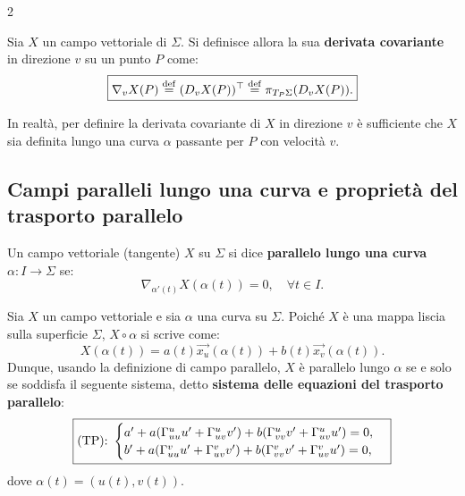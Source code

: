 \begin{multicols*}{2}
    \begin{definition}
        Sia $X$ un campo vettoriale di $\Sigma$. Si definisce allora
        la sua \textbf{derivata covariante} in direzione $v$ su un punto $P$ come:
        \[
            \boxed{\nabla_v X(P) \overset{\mathrm{def}}{=} (D_v X(P))^\top \overset{\mathrm{def}}{=} \pi_{T_P \Sigma}(D_v X(P)).}
        \]
    \end{definition}

    \begin{remark}
        In realtà, per definire la derivata covariante di $X$ in direzione $v$ è sufficiente
        che $X$ sia definita lungo una curva $\alpha$ passante per $P$ con velocità
        $v$.
    \end{remark}

    \subsection{Campi paralleli lungo una curva e proprietà del trasporto parallelo}

    \begin{definition}
        Un campo vettoriale (tangente) $X$ su $\Sigma$ si dice \textbf{parallelo lungo
            una curva $\alpha : I \to \Sigma$} se:
        \[
            \boxed{\nabla_{\alpha'(t)} X(\alpha(t)) = 0, \quad \forall t \in I.}
        \]
    \end{definition}

    \begin{remark}
        Sia $X$ un campo vettoriale e sia $\alpha$ una curva su $\Sigma$. Poiché
        $X$ è una mappa liscia sulla superficie $\Sigma$, $X \circ \alpha$
        si scrive come:
        \[
            X(\alpha(t)) = a(t) \vec{x_u}(\alpha(t)) + b(t) \vec{x_v}(\alpha(t)).
        \]
        Dunque, usando la definizione di campo parallelo, $X$ è parallelo lungo $\alpha$ se
        e solo se soddisfa il seguente sistema, detto \textbf{sistema delle equazioni del
            trasporto parallelo}:
        \begin{equation*} \label{eq:TP}
            \boxed{\textnormal{(TP):  } \begin{cases}
                    a' + a (\Gamma_{uu}^u u' + \Gamma_{uv}^u v') + b(\Gamma_{vv}^u v' + \Gamma_{uv}^u u') = 0, \\
                    b' + a (\Gamma_{uu}^v u' + \Gamma_{uv}^v v') + b(\Gamma_{vv}^v v' + \Gamma_{uv}^v u') = 0,
                \end{cases}}
        \end{equation*}
        dove $\alpha(t) = (u(t), v(t))$.
    \end{remark}


\end{multicols*}
